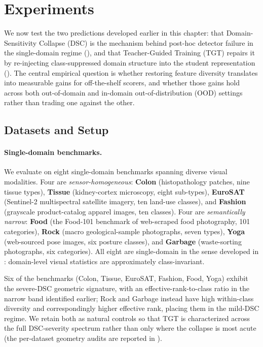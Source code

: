 \section{Experiments}
\label{sec:dsc:experiments}

We now test the two predictions developed earlier in this chapter: that Domain-Sensitivity Collapse (DSC) is the mechanism behind post-hoc detector failure in the single-domain regime (), and that Teacher-Guided Training (TGT) repairs it by re-injecting class-suppressed domain structure into the student representation (). The central empirical question is whether restoring feature diversity translates into measurable gains for off-the-shelf scorers, and whether those gains hold across both out-of-domain and in-domain out-of-distribution (OOD) settings rather than trading one against the other.

\subsection{Datasets and Setup}

\paragraph{Single-domain benchmarks.}
We evaluate on eight single-domain benchmarks spanning diverse visual modalities. Four are \emph{sensor-homogeneous}: \textbf{Colon} (histopathology patches, nine tissue types), \textbf{Tissue} (kidney-cortex microscopy, eight sub-types), \textbf{EuroSAT} (Sentinel-2 multispectral satellite imagery, ten land-use classes), and \textbf{Fashion} (grayscale product-catalog apparel images, ten classes). Four are \emph{semantically narrow}: \textbf{Food} (the Food-101 benchmark of web-scraped food photography, 101 categories), \textbf{Rock} (macro geological-sample photographs, seven types), \textbf{Yoga} (web-sourced pose images, six posture classes), and \textbf{Garbage} (waste-sorting photographs, six categories). All eight are single-domain in the sense developed in : domain-level visual statistics are approximately class-invariant.

Six of the benchmarks (Colon, Tissue, EuroSAT, Fashion, Food, Yoga) exhibit the severe-DSC geometric signature, with an effective-rank-to-class ratio in the narrow band identified earlier; Rock and Garbage instead have high within-class diversity and correspondingly higher effective rank, placing them in the mild-DSC regime. We retain both as natural controls so that TGT is characterized across the full DSC-severity spectrum rather than only where the collapse is most acute (the per-dataset geometry audits are reported in ).

